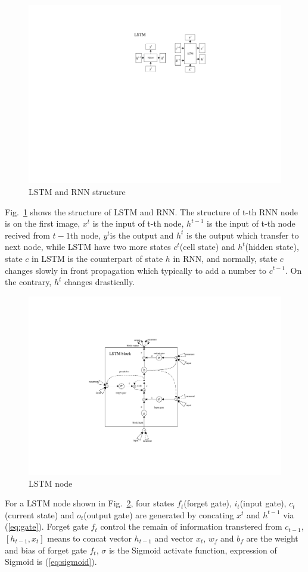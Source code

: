 \documentclass[conference]{IEEEtran}
\begin{document}
      \begin{figure}[htbp]
        \centerline{\includegraphics[width=0.7\linewidth]{figures/LSTM_struc.pdf}}
        \caption{LSTM and RNN structure}
        \label{fig:LSTM}
      \end{figure}

      Fig.~\ref{fig:LSTM} shows the structure of LSTM and RNN. The structure of t-th RNN node is on the first image, $x^t$ is the input of t-th node, $h^{t-1}$ is the input of t-th node recived from $t-1$th node, $y^t$is the output and $h^t$ is the output which transfer to next node, while LSTM have two more states $c^t$(cell state) and $h^t$(hidden state), state $c$ in LSTM is the counterpart of state $h$ in RNN, and normally, state $c$ changes slowly in front propagation which typically to add a number to $c^{t-1}$. On the contrary, $h^t$ changes drastically.

      \begin{figure}[htbp]
        \centerline{\includegraphics[width=0.7\linewidth]{figures/LSTM_node.pdf}}
        \caption{LSTM node}
        \label{fig:LSTM2}
      \end{figure}

      For a LSTM node shown in Fig.~\ref{fig:LSTM2}, four states $f_t$(forget gate), $i_t$(input gate), $c_t$(current state) and $o_t$(output gate) are generated by concating $x^t$ and $h^{t-1}$ via (\ref{eq:gate}). Forget gate $f_t$ control the remain of information transtered from $c_{t-1}$, $[h_{t-1}, x_t]$  means to concat vector $h_{t-1}$ and vector $x_t$, $w_f$ and $b_f$ are the weight and bias of forget gate $f_t$, $\sigma$ is the Sigmoid activate function, expression of Sigmoid is (\ref{eq:sigmoid}).
\end{document}
